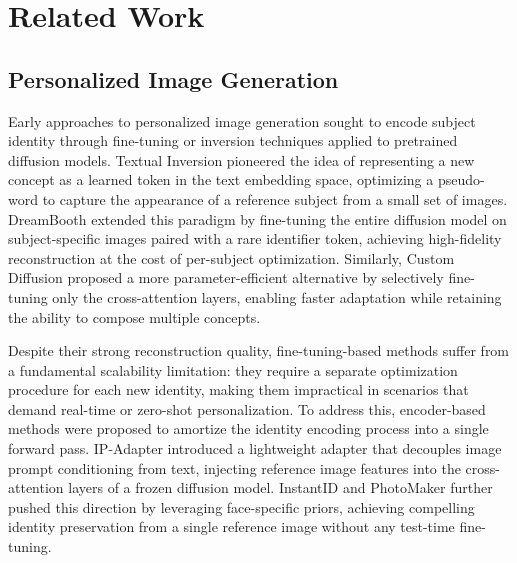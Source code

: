 \documentclass{article}
\begin{document}
\section{Related Work}

\subsection{Personalized Image Generation}
Early approaches to personalized image generation sought to encode subject identity through fine-tuning or inversion techniques applied to pretrained diffusion models. Textual Inversion \cite{gal2022image} pioneered the idea of representing a new concept as a learned token in the text embedding space, optimizing a pseudo-word to capture the appearance of a reference subject from a small set of images. DreamBooth \cite{ruiz2023dreambooth} extended this paradigm by fine-tuning the entire diffusion model on subject-specific images paired with a rare identifier token, achieving high-fidelity reconstruction at the cost of per-subject optimization. Similarly, Custom Diffusion \cite{kumari2023multi} proposed a more parameter-efficient alternative by selectively fine-tuning only the cross-attention layers, enabling faster adaptation while retaining the ability to compose multiple concepts.

Despite their strong reconstruction quality, fine-tuning-based methods suffer from a fundamental scalability limitation: they require a separate optimization procedure for each new identity, making them impractical in scenarios that demand real-time or zero-shot personalization. To address this, encoder-based methods were proposed to amortize the identity encoding process into a single forward pass. IP-Adapter \cite{ye2023ip} introduced a lightweight adapter that decouples image prompt conditioning from text, injecting reference image features into the cross-attention layers of a frozen diffusion model. InstantID \cite{wang2024instantid} and PhotoMaker \cite{li2024photomaker} further pushed this direction by leveraging face-specific priors, achieving compelling identity preservation from a single reference image without any test-time fine-tuning.
\end{document}
